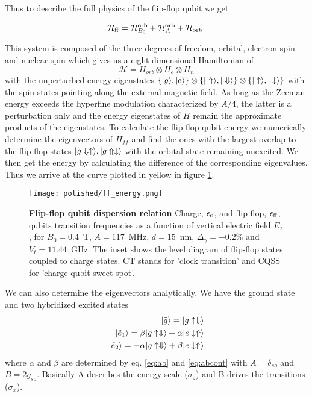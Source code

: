Thus to describe the full physics of the flip-flop qubit we get

\begin{equation} \label{eq:H_ff_ge}
\mathcal{H}_{\rm ff} = \mathcal{H}_{B_0}^{\rm orb} +\mathcal{H}_{A}^{\rm orb} + \mathcal{H}_{\rm orb}.
\end{equation}

This system is composed of the three degrees of freedom, orbital, electron spin and nuclear spin which gives us a eight-dimensional Hamiltonian of
\begin{equation}
\mathcal{H}=H_{orb}\otimes H_{e}\otimes H_{n}
\end{equation}
with the unperturbed energy eigenstates $\{|g\rangle, |e\rangle\} \otimes \{|\Uparrow\rangle, |\Downarrow\rangle\} \otimes  \{|\uparrow\rangle, |\downarrow\rangle\}$ with the spin states pointing along the external magnetic field. 
As long as the Zeeman energy exceeds the hyperfine modulation characterized by $A/4$, the latter is a perturbation only and the energy eigenstates of $H$ remain the approximate products of the eigenstates. 
To calculate the flip-flop qubit energy we numerically determine the eigenvectors of $H_{ff}$ and find the ones with the largest overlap to the flip-flop states $|g \Downarrow \uparrow\rangle, |g\Uparrow\downarrow\rangle$ with the orbital state remaining unexcited. We then get the energy by calculating the difference of the corresponding eigenvalues. Thus we arrive at the curve plotted in yellow in figure \ref{fig:ff_energy}.

\begin{figure}[h]
	\centering
	\texttt{[image: polished/ff\_energy.png]}
	\caption[Flip-flop qubit dispersion relation]{\textbf{Flip-flop qubit dispersion relation} Charge, $\epsilon_{\rm o}$, and flip-flop, $\epsilon_{\rm ff}$, qubits transition frequencies as a function of vertical electric field $E_z$, for $B_0=0.4$~T, $A=117$~MHz, $d=15$~nm, $\Delta_\gamma=-0.2\%$ and $V_t=11.44$~GHz. The inset shows the level diagram of flip-flop states coupled to charge states. CT stands for 'clock transition' and CQSS for 'charge qubit sweet spot'.}
	\label{fig:ff_energy}
\end{figure}

We can also determine the eigenvectors analytically. We have the ground state and two hybridized excited states
\begin{eqnarray}\label{eq:ff_hybrid}
|\tilde{g}\rangle=|g\uparrow\Downarrow\rangle\\
|\tilde{e}_1\rangle=\beta|g\uparrow\Downarrow\rangle+\alpha|e\downarrow\Uparrow\rangle\\
|\tilde{e}_2\rangle=-\alpha|g\uparrow\Downarrow\rangle+\beta|e\downarrow\Uparrow\rangle
\end{eqnarray}
where $\alpha$ and $\beta$ are determined by eq. \eqref{eq:ab} and \eqref{eq:abcont} with $A=\delta_{so}$ and $B=2g_{so}$.  Basically A describes the energy scale ($\sigma_z$) and B drives the transitions ($\sigma_x$). 

